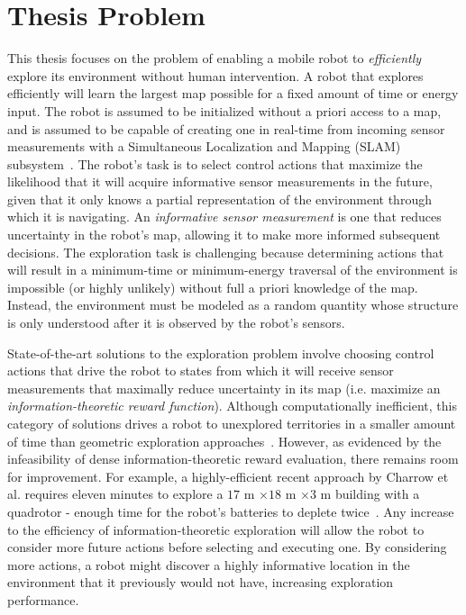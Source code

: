 \section{Thesis Problem}
\label{sec:thesis_problem}



This thesis focuses on the problem of enabling a mobile robot to
\textit{efficiently} explore its environment without human intervention.
A robot that explores efficiently will learn the largest map possible
for a fixed amount of time or energy input.
The robot is assumed to be initialized without a
priori access to a map, and is assumed to be capable of creating one in
real-time from incoming sensor measurements with a Simultaneous Localization and
Mapping (SLAM) subsystem~\cite{thrun2005probabilistic}. The robot's task is to select
control actions that maximize the likelihood that it will acquire informative sensor measurements
in the future, given that it only knows a partial representation of the
environment through which it is navigating. An \textit{informative sensor measurement}
is one that reduces uncertainty in the robot's map, allowing it to make
more informed subsequent decisions. The exploration task is
challenging because determining actions that will result in a minimum-time or
minimum-energy traversal of the environment is impossible (or highly unlikely) without
full a priori knowledge of the map. Instead, the environment must be modeled as a random
quantity whose structure is only understood after it is observed by the robot's
sensors.

State-of-the-art solutions to the exploration problem involve choosing control actions
that drive the robot to states from which it will receive sensor measurements that
maximally reduce uncertainty in its map (i.e. maximize an \textit{information-theoretic
reward function}). Although computationally
inefficient, this category of solutions drives a robot to unexplored territories
in a smaller amount of time than geometric exploration
approaches~\cite{charrow2015icra}. However, as evidenced by the infeasibility of
dense information-theoretic reward evaluation, there
remains room for improvement. For example, a highly-efficient recent approach by
Charrow et al. requires eleven minutes to explore a $17$ m $\times 18$ m $\times
3$ m building with a quadrotor - enough time for the robot's batteries to
deplete twice~\cite{charrow2015icra}. Any increase to the efficiency of
information-theoretic exploration will allow the robot to consider more future
actions before selecting and executing one. By considering more actions, a robot
might discover a highly informative location in the environment that it
previously would not have, increasing exploration performance.

